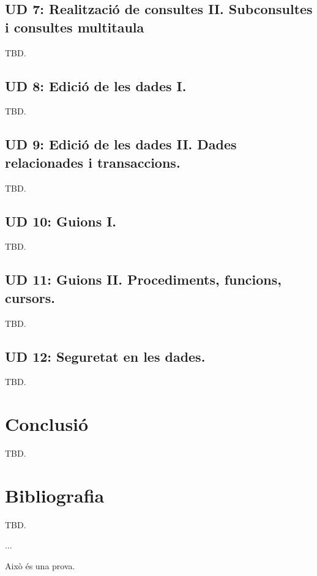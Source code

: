 \documentclass[catalan, a4paper, 12pt, titlepage]{article}
\begin{document}
  \subsection{UD 7: Realització de consultes II. Subconsultes i consultes multitaula}
  TBD.

  \subsection{UD 8: Edició de les dades I.}
  TBD.

  \subsection{UD 9: Edició de les dades II. Dades relacionades i transaccions.}
  TBD.

  \subsection{UD 10: Guions I.}
  TBD.

  \subsection{UD 11: Guions II. Procediments, funcions, cursors.}
  TBD.

  \subsection{UD 12: Seguretat en les dades.}
  TBD.

\section{Conclusió}
TBD.

\section{Bibliografia}
TBD.

...

Això és una prova.
\end{document}
